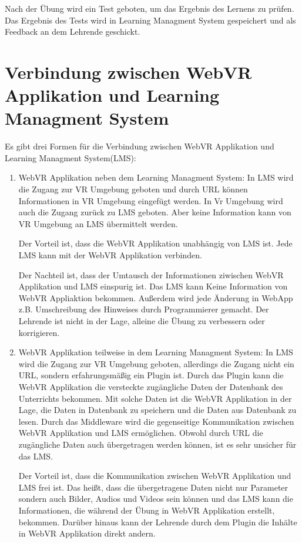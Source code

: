 Nach der Übung wird ein Test geboten, um das Ergebnis des Lernens zu prüfen. Das Ergebnis des Tests wird in Learning Managment System gespeichert und als Feedback an dem Lehrende geschickt.

\section{Verbindung zwischen WebVR Applikation und Learning Managment System}
Es gibt drei Formen für die Verbindung zwischen WebVR Applikation und Learning Managment System(LMS):
\begin{enumerate}
    \item WebVR Applikation neben dem Learning Managment System:
     \subitem In LMS wird die Zugang zur VR Umgebung geboten und durch URL können Informationen in VR Umgebung eingefügt werden. In Vr Umgebung wird auch die Zugang zurück zu LMS geboten. Aber keine Information kann von VR Umgebung an LMS übermittelt werden.
     
     Der Vorteil ist, dass die WebVR Applikation unabhängig von LMS ist. Jede LMS kann mit der WebVR Applikation verbinden.
     
     Der Nachteil ist, dass der Umtausch der Informationen ziwischen WebVR Applikation und LMS einspurig ist. Das LMS kann Keine Information von WebVR Appliaktion bekommen. Außerdem wird jede Änderung in WebApp z.B. Umschreibung des Hinweises durch Programmierer gemacht. Der Lehrende ist nicht in der Lage, alleine die Übung zu verbessern oder korrigieren.
     
    \item WebVR Applikation teilweise in dem Learning Managment System:
     \subitem In LMS wird die Zugang zur VR Umgebung geboten, allerdings die Zugang nicht ein URL, sondern erfahrungsmäßig ein Plugin ist. Durch das Plugin kann die WebVR Applikation die versteckte zugängliche Daten der Datenbank des Unterrichts bekommen. Mit solche Daten ist die WebVR Applikation in der Lage, die Daten in Datenbank zu speichern und die Daten aus Datenbank zu lesen. Durch das Middleware wird die gegenseitige Kommunikation zwischen WebVR Applikation und LMS ermöglichen. Obwohl durch URL die zugängliche Daten auch übergetragen werden können, ist es sehr unsicher für das LMS.
     
     Der Vorteil ist, dass die Kommunikation zwischen WebVR Applikation und LMS frei ist. Das heißt, dass die übergetragene Daten nicht nur Parameter sondern auch Bilder, Audios und Videos sein können und das LMS kann die Informationen, die während der Übung in WebVR Applikation erstellt, bekommen. Darüber hinaus kann der Lehrende durch dem Plugin die Inhälte in WebVR Applikation direkt andern.
     

\end{enumerate}

